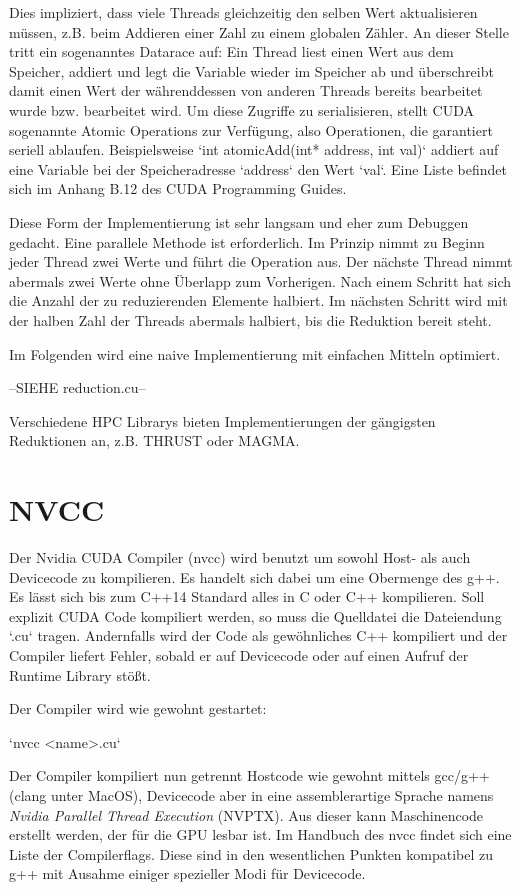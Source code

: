 		Dies impliziert, dass viele \Glspl{Thread} gleichzeitig den selben Wert aktualisieren müssen, z.B. beim Addieren einer Zahl zu einem globalen Zähler. An dieser Stelle tritt ein sogenanntes Datarace auf: Ein \Gls{Thread} liest einen Wert aus dem Speicher, addiert und legt die Variable wieder im Speicher ab und überschreibt damit einen Wert der währenddessen von anderen \Glspl{Thread} bereits bearbeitet wurde bzw. bearbeitet wird. Um diese Zugriffe zu serialisieren, stellt CUDA sogenannte Atomic Operations zur Verfügung, also Operationen, die garantiert seriell ablaufen. Beispielsweise \li`int atomicAdd(int* address, int val)` addiert auf eine Variable bei der Speicheradresse \li`address` den Wert \li`val`. Eine Liste befindet sich im Anhang B.12 des CUDA Programming Guides. \autocite{cudaPG}
		
		Diese Form der Implementierung ist sehr langsam und eher zum Debuggen gedacht. Eine parallele Methode ist erforderlich. Im Prinzip nimmt zu Beginn jeder \Gls{Thread} zwei Werte und führt die Operation aus. Der nächste \Gls{Thread} nimmt abermals zwei Werte ohne Überlapp zum Vorherigen. Nach einem Schritt hat sich die Anzahl der zu reduzierenden Elemente halbiert. Im nächsten Schritt wird mit der halben Zahl der \Glspl{Thread} abermals halbiert, bis die Reduktion bereit steht.
		
		Im Folgenden wird eine naive Implementierung mit einfachen Mitteln optimiert.
		
		--SIEHE reduction.cu--
		
		Verschiedene HPC Librarys bieten Implementierungen der gängigsten Reduktionen an, z.B. THRUST oder MAGMA. 
		
		
		\section{NVCC}
		Der Nvidia CUDA Compiler (\gls{nvcc}) wird benutzt um sowohl Host- als auch Devicecode zu kompilieren. Es handelt sich dabei um eine Obermenge des g++. Es lässt sich bis zum C++14 Standard alles in C oder C++ kompilieren. Soll explizit CUDA Code kompiliert werden, so muss die Quelldatei die Dateiendung \li`.cu` tragen. Andernfalls wird der Code als gewöhnliches C++ kompiliert und der Compiler liefert Fehler, sobald er auf Devicecode oder auf einen Aufruf der Runtime Library stößt.
		
		Der Compiler wird wie gewohnt gestartet:
		
		\li`nvcc <name>.cu`
		
		Der Compiler kompiliert nun getrennt Hostcode wie gewohnt mittels gcc/g++ (clang unter MacOS), Devicecode aber in eine assemblerartige Sprache namens \textit{Nvidia Parallel Thread Execution} (\Gls{NVPTX}). Aus dieser kann Maschinencode erstellt werden, der für die GPU lesbar ist. Im Handbuch des \gls{nvcc} \autocite{cudaNVCC} findet sich eine Liste der Compilerflags. Diese sind in den wesentlichen Punkten kompatibel zu g++ mit Ausahme einiger spezieller Modi für Devicecode.
		

